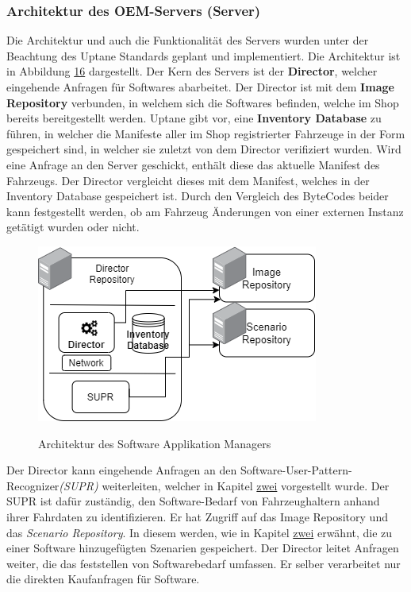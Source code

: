 \subsubsection{Architektur des OEM-Servers (Server)}
Die Architektur und auch die Funktionalität des Servers wurden unter der Beachtung des Uptane Standards geplant und implementiert. Die Architektur ist in Abbildung \hyperref[img:server]{16} dargestellt. Der Kern des Servers ist der \textbf{Director}, welcher eingehende Anfragen für Softwares abarbeitet. Der Director ist mit dem\textbf{ Image Repository} verbunden, in welchem sich die Softwares befinden, welche im Shop bereits bereitgestellt werden. Uptane gibt vor, eine \textbf{Inventory Database} zu führen, in welcher die Manifeste aller im Shop registrierter Fahrzeuge in der Form gespeichert sind, in welcher sie zuletzt von dem Director verifiziert wurden. Wird eine Anfrage an den Server geschickt, enthält diese das aktuelle Manifest des Fahrzeugs. Der Director vergleicht dieses mit dem Manifest, welches in der Inventory Database gespeichert ist. Durch den Vergleich des ByteCodes beider kann festgestellt werden, ob am Fahrzeug Änderungen von einer externen Instanz getätigt wurden oder nicht.
\begin{figure}[!h]
	\centering
	\includegraphics[width=0.75\columnwidth]{pictures/konzept-OEM-vs.png}
	\label{img:server}
	\caption{Architektur des Software Applikation Managers}
\end{figure}

Der Director kann eingehende Anfragen an den Software-User-Pattern-Recognizer\textit{(SUPR)} weiterleiten, welcher in Kapitel \hyperref[fs]{zwei} vorgestellt wurde. Der SUPR ist dafür zuständig, den Software-Bedarf von Fahrzeughaltern anhand ihrer Fahrdaten zu identifizieren. Er hat Zugriff auf das Image Repository und das \textit{Scenario Repository}. In diesem werden, wie in Kapitel \hyperref[konzept]{zwei} erwähnt, die zu einer Software hinzugefügten Szenarien gespeichert. Der Director leitet Anfragen weiter, die das feststellen von Softwarebedarf umfassen. Er selber verarbeitet nur die direkten Kaufanfragen für Software.

